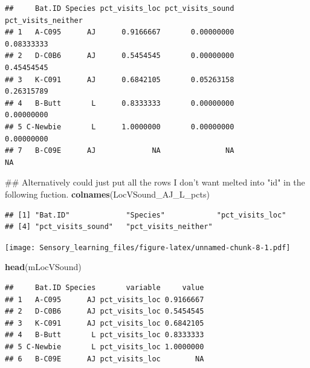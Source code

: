 \documentclass[]{article}
\newenvironment{Shaded}{\begin{snugshade}}{\end{snugshade}}
\newcommand{\KeywordTok}[1]{\textcolor[rgb]{0.13,0.29,0.53}{\textbf{{#1}}}}
\newcommand{\DataTypeTok}[1]{\textcolor[rgb]{0.13,0.29,0.53}{{#1}}}
\newcommand{\StringTok}[1]{\textcolor[rgb]{0.31,0.60,0.02}{{#1}}}
\newcommand{\NormalTok}[1]{{#1}}
\begin{document}
\begin{verbatim}
##     Bat.ID Species pct_visits_loc pct_visits_sound pct_visits_neither
## 1   A-C095      AJ      0.9166667       0.00000000         0.08333333
## 2   D-C0B6      AJ      0.5454545       0.00000000         0.45454545
## 3   K-C091      AJ      0.6842105       0.05263158         0.26315789
## 4   B-Butt       L      0.8333333       0.00000000         0.00000000
## 5 C-Newbie       L      1.0000000       0.00000000         0.00000000
## 7   B-C09E      AJ             NA               NA                 NA
\end{verbatim}

\begin{Shaded}
\begin{Highlighting}[]
\NormalTok{## Alternatively could just put all the rows I don't want melted into "id" in the following fuction. }
\KeywordTok{colnames}\NormalTok{(LocVSound_AJ_L_pcts)}
\end{Highlighting}
\end{Shaded}

\begin{verbatim}
## [1] "Bat.ID"             "Species"            "pct_visits_loc"    
## [4] "pct_visits_sound"   "pct_visits_neither"
\end{verbatim}

\begin{Shaded}
\end{Shaded}

\texttt{[image: Sensory\_learning\_files/figure-latex/unnamed-chunk-8-1.pdf]}

\begin{Shaded}
\begin{Highlighting}[]
\KeywordTok{head}\NormalTok{(mLocVSound)}
\end{Highlighting}
\end{Shaded}

\begin{verbatim}
##     Bat.ID Species       variable     value
## 1   A-C095      AJ pct_visits_loc 0.9166667
## 2   D-C0B6      AJ pct_visits_loc 0.5454545
## 3   K-C091      AJ pct_visits_loc 0.6842105
## 4   B-Butt       L pct_visits_loc 0.8333333
## 5 C-Newbie       L pct_visits_loc 1.0000000
## 6   B-C09E      AJ pct_visits_loc        NA
\end{verbatim}
\end{document}
